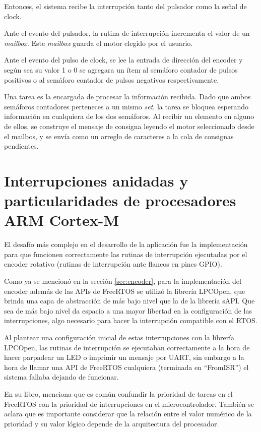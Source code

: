 \documentclass{IEEEtran}
\begin{document}
Entonces, el sistema recibe la interrupción tanto del pulsador como la señal de clock.

Ante el evento del pulsador, la rutina de interrupción incrementa el valor de un \textit{mailbox}. Este \textit{mailbox} guarda el motor elegido por el usuario.

Ante el evento del pulso de clock, se lee la entrada de dirección del encoder y según sea su valor 1 o 0 se agregara un ítem al semáforo contador de pulsos positivos o al semáforo contador de pulsos negativos respectivamente.

Una tarea es la encargada de procesar la información recibida. Dado que ambos semáforos contadores perteneces a un mismo \textit{set}, la tarea se bloquea esperando información en cualquiera de los dos semáforos. Al recibir un elemento en alguno de ellos, se construye el mensaje de consigna leyendo el motor seleccionado desde el mailbos, y se envía como un arreglo de caracteres a la cola de consignas pendientes.

\section{Interrupciones anidadas y particularidades de procesadores ARM Cortex-M}
El desafío más complejo en el desarrollo de la aplicación fue la implementación para que funcionen correctamente las rutinas de interrupción ejecutadas por el encoder rotativo (rutinas de interrupción ante flancos en pines GPIO).

Como ya se mencionó en la sección \ref{sec:encoder}, para la implementación del encoder además de las APIs de FreeRTOS se utilizó la librería LPCOpen, que brinda una capa de abstracción de más bajo nivel que la de la librería sAPI. Que sea de más bajo nivel da espacio a una mayor libertad en la configuración de las interrupciones, algo necesario para hacer la interrupción compatible con el RTOS.

Al plantear una configuración inicial de estas interrupciones con la librería LPCOpen, las rutinas de interrupción se ejecutaban correctamente a la hora de hacer parpadear un LED o imprimir un mensaje por UART, sin embargo a la hora de llamar una API de FreeRTOS cualquiera (terminada en ``FromISR'') el sistema fallaba dejando de funcionar.

En su libro, \textcite{FreeRTOS} menciona que es común confundir la prioridad de tareas en el FreeRTOS con la prioridad de interrupciones en el microcontrolador. También se aclara que es importante considerar que la relación entre el valor numérico de la prioridad y su valor lógico depende de la arquitectura del procesador.
\end{document}
